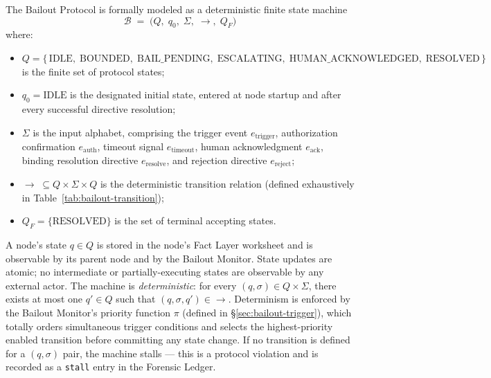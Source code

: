 The Bailout Protocol is formally modeled as a deterministic finite state machine
\begin{equation}
\mathcal{B} \;=\; \bigl(Q,\; q_0,\; \Sigma,\; \rightarrow,\; Q_F\bigr)
\end{equation}
where:

\begin{itemize}\itemsep0em
\item $Q = \{\,\text{IDLE},\; \text{BOUNDED},\; \text{BAIL\_PENDING},\; \text{ESCALATING},\; \text{HUMAN\_ACKNOWLEDGED},\; \text{RESOLVED}\,\}$ is the finite set of protocol states;
\item $q_0 = \text{IDLE}$ is the designated initial state, entered at node startup and after every successful directive resolution;
\item $\Sigma$ is the input alphabet, comprising the trigger event $e_{\text{trigger}}$, authorization confirmation $e_{\text{auth}}$, timeout signal $e_{\text{timeout}}$, human acknowledgment $e_{\text{ack}}$, binding resolution directive $e_{\text{resolve}}$, and rejection directive $e_{\text{reject}}$;
\item $\rightarrow\;\subseteq Q \times \Sigma \times Q$ is the deterministic transition relation (defined exhaustively in Table~\ref{tab:bailout-transition});
\item $Q_F = \{\text{RESOLVED}\}$ is the set of terminal accepting states.
\end{itemize}

A node's state $q \in Q$ is stored in the node's Fact Layer worksheet and is observable by its parent node and by the Bailout Monitor. State updates are atomic; no intermediate or partially-executing states are observable by any external actor. The machine is \emph{deterministic}: for every $(q, \sigma) \in Q \times \Sigma$, there exists at most one $q' \in Q$ such that $(q, \sigma, q') \in \rightarrow$. Determinism is enforced by the Bailout Monitor's priority function $\pi$ (defined in \S\ref{sec:bailout-trigger}), which totally orders simultaneous trigger conditions and selects the highest-priority enabled transition before committing any state change. If no transition is defined for a $(q, \sigma)$ pair, the machine stalls — this is a protocol violation and is recorded as a \texttt{stall} entry in the Forensic Ledger.

